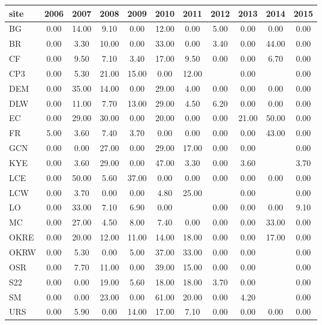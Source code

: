 \documentclass[12pt, oneside, titlepage]{article}   	%
\begin{document}
 \newpage
 
  \label{tab:undercount} 
\begin{table}[ht]
\centering
\begin{tabular}{lcccccccccc}
  \hline
site & 2006 & 2007 & 2008 & 2009 & 2010 & 2011 & 2012 & 2013 & 2014 & 2015 \\ 
  \hline
BG & 0.00 & 14.00 & 9.10 & 0.00 & 12.00 & 0.00 & 5.00 & 0.00 & 0.00 & 0.00 \\ 
  BR & 0.00 & 3.30 & 10.00 & 0.00 & 33.00 & 0.00 & 3.40 & 0.00 & 44.00 & 0.00 \\ 
  CF & 0.00 & 9.50 & 7.10 & 3.40 & 17.00 & 9.50 & 0.00 & 0.00 & 6.70 & 0.00 \\ 
  CP3 & 0.00 & 5.30 & 21.00 & 15.00 & 0.00 & 12.00 &  & 0.00 &  & 0.00 \\ 
  DEM & 0.00 & 35.00 & 14.00 & 0.00 & 29.00 & 4.00 & 0.00 & 0.00 & 0.00 & 0.00 \\ 
  DLW & 0.00 & 11.00 & 7.70 & 13.00 & 29.00 & 4.50 & 6.20 & 0.00 & 0.00 & 0.00 \\ 
  EC & 0.00 & 29.00 & 30.00 & 0.00 & 20.00 & 0.00 & 0.00 & 21.00 & 50.00 & 0.00 \\ 
  FR & 5.00 & 3.60 & 7.40 & 3.70 & 0.00 & 0.00 & 0.00 & 0.00 & 43.00 & 0.00 \\ 
  GCN & 0.00 & 0.00 & 27.00 & 0.00 & 29.00 & 17.00 & 0.00 & 0.00 &  & 0.00 \\ 
  KYE & 0.00 & 3.60 & 29.00 & 0.00 & 47.00 & 3.30 & 0.00 & 3.60 &  & 3.70 \\ 
  LCE & 0.00 & 50.00 & 5.60 & 37.00 & 0.00 & 0.00 & 0.00 & 0.00 & 0.00 & 0.00 \\ 
  LCW & 0.00 & 3.70 & 0.00 & 0.00 & 4.80 & 25.00 &  & 0.00 &  & 0.00 \\ 
  LO & 0.00 & 33.00 & 7.10 & 6.90 & 0.00 &  & 0.00 & 0.00 & 0.00 & 9.10 \\ 
  MC & 0.00 & 27.00 & 4.50 & 8.00 & 7.40 & 0.00 & 0.00 & 0.00 & 33.00 & 0.00 \\ 
  OKRE & 0.00 & 20.00 & 12.00 & 11.00 & 14.00 & 18.00 & 0.00 & 0.00 & 17.00 & 0.00 \\ 
  OKRW & 0.00 & 5.30 & 0.00 & 5.00 & 37.00 & 33.00 & 0.00 & 0.00 &  & 0.00 \\ 
  OSR & 0.00 & 7.70 & 11.00 & 0.00 & 39.00 & 15.00 & 0.00 & 0.00 &  & 0.00 \\ 
  S22 & 0.00 & 0.00 & 19.00 & 5.60 & 18.00 & 18.00 & 3.70 & 0.00 &  & 0.00 \\ 
  SM & 0.00 & 0.00 & 23.00 & 0.00 & 61.00 & 20.00 & 0.00 & 4.20 &  & 0.00 \\ 
  URS & 0.00 & 5.90 & 0.00 & 14.00 & 17.00 & 7.10 & 0.00 & 0.00 & 0.00 & 0.00 \\
      \hline
\end{tabular}
\end{table}
 
\end{document}
